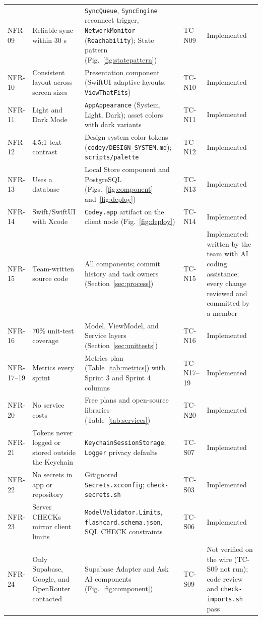 \documentclass[12pt,letterpaper]{article}
\begin{document}
\begin{xltabular}{\textwidth}{@{}l L{3.2cm} Y l L{2.6cm}@{}}
NFR-09 & Reliable sync within 30 s & \texttt{SyncQueue}, \texttt{SyncEngine} reconnect trigger, \texttt{NetworkMonitor} (\texttt{Reachability}); State pattern (Fig.~\ref{fig:statepattern}) & TC-N09 & Implemented \\
NFR-10 & Consistent layout across screen sizes & Presentation component (SwiftUI adaptive layouts, \texttt{ViewThatFits}) & TC-N10 & Implemented \\
NFR-11 & Light and Dark Mode & \texttt{AppAppearance} (System, Light, Dark); asset colors with dark variants & TC-N11 & Implemented \\
NFR-12 & 4.5:1 text contrast & Design-system color tokens (\texttt{codey/DESIGN\_SYSTEM.md}); \texttt{scripts/palette} & TC-N12 & Implemented \\
NFR-13 & Uses a database & Local Store component and PostgreSQL (Figs.~\ref{fig:component} and~\ref{fig:deploy}) & TC-N13 & Implemented \\
NFR-14 & Swift/SwiftUI with Xcode & \texttt{Codey.app} artifact on the client node (Fig.~\ref{fig:deploy}) & TC-N14 & Implemented \\
NFR-15 & Team-written source code & All components; commit history and task owners (Section~\ref{sec:process}) & TC-N15 & Implemented: written by the team with AI coding assistance; every change reviewed and committed by a member \\
NFR-16 & 70\% unit-test coverage & Model, ViewModel, and Service layers (Section~\ref{sec:unittests}) & TC-N16 & Implemented \\
NFR-17--19 & Metrics every sprint & Metrics plan (Table~\ref{tab:metrics}) with Sprint 3 and Sprint 4 columns & TC-N17--19 & Implemented \\
NFR-20 & No service costs & Free plans and open-source libraries (Table~\ref{tab:services}) & TC-N20 & Implemented \\
NFR-21 & Tokens never logged or stored outside the Keychain & \texttt{KeychainSessionStorage}; \texttt{Logger} privacy defaults & TC-S07 & Implemented \\
NFR-22 & No secrets in app or repository & Gitignored \texttt{Secrets.xcconfig}; \texttt{check-secrets.sh} & TC-S03 & Implemented \\
NFR-23 & Server CHECKs mirror client limits & \texttt{ModelValidator.Limits}, \texttt{flashcard.schema.json}, SQL CHECK constraints & TC-S06 & Implemented \\
NFR-24 & Only Supabase, Google, and OpenRouter contacted & Supabase Adapter and Ask AI components (Fig.~\ref{fig:component}) & TC-S09 & Not verified on the wire (TC-S09 not run); code review and \texttt{check-imports.sh} pass \\

\end{xltabular}
\end{document}
